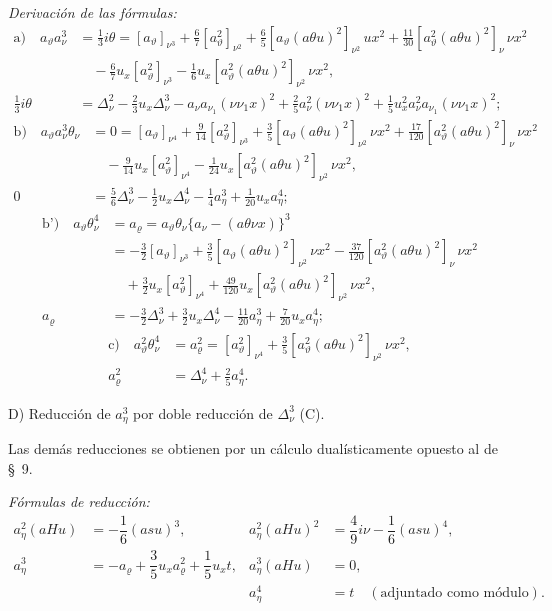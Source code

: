 \documentclass[11pt]{article}
\newcommand{\A}{\Delta}
\newcommand{\R}{\varrho}
\begin{document}
\noindent\emph{Derivación de las fórmulas:}
\[
\begin{aligned}
\text{a)}\quad
 a_\vartheta a_\nu^3
&=\frac13 i\theta
=[a_\vartheta]_{\nu^3}+\frac67[a_\vartheta^2]_{\nu^2}
+\frac65[a_\vartheta(a\theta u)^2]_{\nu^2}\,
u x^2
+\frac{11}{30}[a_\vartheta^2(a\theta u)^2]_\nu\,\nu x^2\\
&\quad-\frac67u_x[a_\vartheta^2]_{\nu^3}
-\frac16u_x[a_\vartheta^2(a\theta u)^2]_{\nu^2}\,\nu x^2,\\
\frac13 i\theta
&=\A_\nu^2-\frac23u_x\A_\nu^3-a_\nu a_{\nu_1}(\nu\nu_1x)^2
+\frac25a_\nu^2(\nu\nu_1x)^2
+\frac15u_x^2a_\nu^2a_{\nu_1}(\nu\nu_1x)^2;
\end{aligned}
\]
\[
\begin{aligned}
\text{b)}\quad
 a_\vartheta a_\nu^3\theta_\nu
&=0=[a_\vartheta]_{\nu^4}+\frac9{14}[a_\vartheta^2]_{\nu^3}
+\frac35[a_\vartheta(a\theta u)^2]_{\nu^2}\,\nu x^2
+\frac{17}{120}[a_\vartheta^2(a\theta u)^2]_{\nu}\,\nu x^2\\
&\quad-\frac9{14}u_x[a_\vartheta^2]_{\nu^4}
-\frac1{24}u_x[a_\vartheta^2(a\theta u)^2]_{\nu^2}\,\nu x^2,\\
0&=\frac56\A_\nu^3-\frac12u_x\A_\nu^4-\frac14a_\eta^3+\frac1{20}u_xa_\eta^4;
\end{aligned}
\]
\[
\begin{aligned}
\text{b')}\quad
 a_\vartheta\theta_\nu^4
&=a_\R=a_\vartheta\theta_\nu\{a_\nu-(a\theta\nu x)\}^3\\
&=-\frac32[a_\vartheta]_{\nu^3}+\frac35[a_\vartheta(a\theta u)^2]_{\nu^2}\,\nu x^2
-\frac{37}{120}[a_\vartheta^2(a\theta u)^2]_{\nu}\,\nu x^2\\
&\quad+\frac32u_x[a_\vartheta^2]_{\nu^4}
+\frac{49}{120}u_x[a_\vartheta^2(a\theta u)^2]_{\nu^2}\,\nu x^2,\\
a_\R&=-\frac32\A_\nu^3+\frac32u_x\A_\nu^4-\frac{11}{20}a_\eta^3+\frac7{20}u_xa_\eta^4;
\end{aligned}
\]
\[
\begin{aligned}
\text{c)}\quad
 a_\vartheta^2\theta_\nu^4
&=a_\R^2=[a_\vartheta^2]_{\nu^4}+\frac35[a_\vartheta^2(a\theta u)^2]_{\nu^2}\,\nu x^2,\\
a_\R^2&=\A_\nu^4+\frac25a_\eta^4.
\end{aligned}
\]

\noindent D) Reducción de $a_\eta^3$ por doble reducción de $\A_\nu^3$ (C).

Las demás reducciones se obtienen por un cálculo dualísticamente opuesto al de \S\ 9.

\noindent\emph{Fórmulas de reducción:}
\[
\tag{11}
\begin{array}{rl|rl}
a_\eta^2(aHu)&=-\dfrac16(asu)^3,&
 a_\eta^2(aHu)^2&=\dfrac49 i\nu-\dfrac16(asu)^4,\\[0.7em]
a_\eta^3&=-a_\R+\dfrac35u_xa_\R^2+\dfrac15u_xt,
& a_\eta^3(aHu)&=0,\\[0.7em]
&&a_\eta^4&=t\quad(\text{adjuntado como módulo}).
\end{array}
\]
\end{document}
